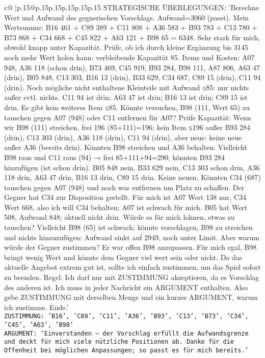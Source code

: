 \documentclass{article}
\begin{document}
{\begin{supertabular}{c@{$\;$}|p{.15\linewidth}@{}p{.15\linewidth}p{.15\linewidth}p{.15\linewidth}p{.15\linewidth}p{.15\linewidth}}
{{{	 STRATEGISCHE ÜBERLEGUNGEN: {'Berechne Wert und Aufwand des gegnerischen Vorschlags. Aufwand=3060 (passt). Mein Wertsumme: B16 461 + C89 389 + C11 808 + A36 583 + B93 783 + C13 780 + B73 868 + C34 668 + C45 822 + A63 121 + B98 65 = 6348. Sehr stark für mich, obwohl knapp unter Kapazität. Prüfe, ob ich durch kleine Ergänzung bis 3145 noch mehr Wert holen kann: verbleibende Kapazität 85. Items und Kosten: A07 948, A36 118 (schon drin), B73 469, C45 919, B93 284, B98 111, A87 806, A63 47 (drin), B05 848, C13 303, B16 13 (drin), B33 629, C34 687, C89 15 (drin), C11 94 (drin). Noch mögliche nicht enthaltene Kleinteile mit Aufwand ≤85: nur nichts außer evtl. nichts. C11 94 ist drin; A63 47 ist drin; B16 13 ist drin; C89 15 ist drin. Es gibt kein weiteres Item ≤85. Könnte versuchen, B98 (111, Wert 65) zu tauschen gegen A07 (948) oder C11 entfernen für A07? Prüfe Kapazität: Wenn wir B98 (111) streichen, frei 196 (85+111)=196; kein Item ≤196 außer B93 284 (drin), C13 303 (drin), A36 118 (drin), C11 94 (drin), aber neue: keine neue außer A36 (bereits drin). Könnten B98 streichen und A36 behalten. Vielleicht B98 raus und C11 raus (94) → frei 85+111+94=290; könnten B93 284 hinzufügen (ist schon drin). B05 848 nein, B33 629 nein, C13 303 schon drin, A36 118 drin, A63 47 drin, B16 13 drin, C89 15 drin. Keine neuen. Könnten C34 (687) tauschen gegen A07 (948) und noch was entfernen um Platz zu schaffen. Der Gegner hat C34 zur Disposition gestellt. Für mich ist A07 Wert 138 nur, C34 Wert 668, also ich will C34 behalten; A07 ist schwach für mich. B05 hat Wert 508, Aufwand 848; aktuell nicht drin. Würde es für mich lohnen, etwas zu tauschen? Vielleicht B98 (65) ist schwach; könnte vorschlagen, B98 zu streichen und nichts hinzuzufügen: Aufwand sinkt auf 2949, noch unter Limit. Aber warum würde der Gegner zustimmen? Er war offen B98 anzupassen. Für mich egal, B98 bringt wenig Wert und könnte dem Gegner viel wert sein oder nicht. Da das aktuelle Angebot extrem gut ist, sollte ich einfach zustimmen, um das Spiel sofort zu beenden. Regel: Ich darf nur mit ZUSTIMMUNG akzeptieren, da es Vorschlag des anderen ist. Ich muss in jeder Nachricht ein ARGUMENT enthalten. Also gebe ZUSTIMMUNG mit derselben Menge und ein kurzes ARGUMENT, warum ich zustimme. Ende.'}\\ \tt ZUSTIMMUNG: {'B16', 'C89', 'C11', 'A36', 'B93', 'C13', 'B73', 'C34', 'C45', 'A63', 'B98'}\\ \tt ARGUMENT: {'Einverstanden – der Vorschlag erfüllt die Aufwandsgrenze und deckt für mich viele nützliche Positionen ab. Danke für die Offenheit bei möglichen Anpassungen; so passt es für mich bereits.'} 
	  } 
	   } 
	   } 
	  \\ 
 


\end{supertabular}}
\end{document}
